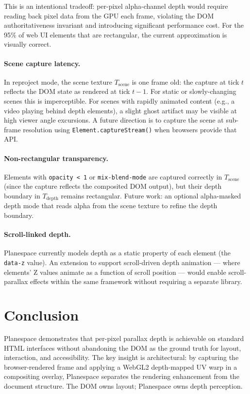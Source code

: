 \documentclass[10pt,twocolumn]{article}
\newcommand{\Tscene}{T_{\mathrm{scene}}}
\newcommand{\Tdepth}{T_{\mathrm{depth}}}
\begin{document}
This is an intentional tradeoff: per-pixel alpha-channel depth would require
reading back pixel data from the GPU each frame, violating the DOM
authoritativeness invariant and introducing significant performance cost.
For the 95\% of web UI elements that are rectangular, the current
approximation is visually correct.

\paragraph{Scene capture latency.}
In reproject mode, the scene texture $\Tscene$ is one frame old: the
capture at tick $t$ reflects the DOM state as rendered at tick $t-1$.
For static or slowly-changing scenes this is imperceptible. For scenes with
rapidly animated content (e.g., a video playing behind depth elements),
a slight ghost artifact may be visible at high viewer angle excursions.
A future direction is to capture the scene at sub-frame resolution using
\texttt{Element.captureStream()} when browsers provide that API.

\paragraph{Non-rectangular transparency.}
Elements with \texttt{opacity < 1} or \texttt{mix-blend-mode} are captured
correctly in $\Tscene$ (since the capture reflects the composited DOM output),
but their depth boundary in $\Tdepth$ remains rectangular. Future work:
an optional alpha-masked depth mode that reads alpha from the scene texture
to refine the depth boundary.

\paragraph{Scroll-linked depth.}
Planespace currently models depth as a static property of each element
(the \texttt{data-z} value). An extension to support scroll-driven depth
animation --- where elements' Z values animate as a function of scroll
position --- would enable scroll-parallax effects within the same framework
without requiring a separate library.

\section{Conclusion}
\label{sec:conclusion}

Planespace demonstrates that per-pixel parallax depth is achievable on
standard HTML interfaces without abandoning the DOM as the ground truth for
layout, interaction, and accessibility. The key insight is architectural:
by capturing the browser-rendered frame and applying a WebGL2 depth-mapped
UV warp in a compositing overlay, Planespace separates the rendering
enhancement from the document structure. The DOM owns layout; Planespace owns
depth perception.
\end{document}
